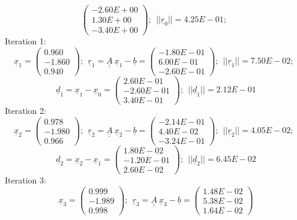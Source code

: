 \documentclass{report}[10pts]
\begin{document}
\begin{small}
\[\begin{pmatrix}
   -2.60E+00 \\ 1.30E+00 \\ -3.40E+00
   \end{pmatrix}
;~~
||
\underline{r}_{0}
||=
4.25E-01
;~~
\]
Iteration 1:
\[
\underline{x}_{1}=
   \begin{pmatrix}
   0.960 \\ -1.860 \\ 0.940
   \end{pmatrix}
;~~
\underline{r}_{1}=
\underline{\underline{A}}~\underline{x}_{1}-
\underline{b}=
   \begin{pmatrix}
   -1.80E-01 \\ 6.00E-01 \\ -2.60E-01
   \end{pmatrix}
;~~
||
\underline{r}_{1}
||=
7.50E-02
;~~
\]
\[
\underline{d}_{1}=
\underline{x}_{1}-
\underline{x}_{0}=
   \begin{pmatrix}
   2.60E-01 \\ -2.60E-01 \\ 3.40E-01
   \end{pmatrix}
;~~
||
\underline{d}_{1}
||=
2.12E-01
\]
Iteration 2:
\[
\underline{x}_{2}=
   \begin{pmatrix}
   0.978 \\ -1.980 \\ 0.966
   \end{pmatrix}
;~~
\underline{r}_{2}=
\underline{\underline{A}}~\underline{x}_{2}-
\underline{b}=
   \begin{pmatrix}
   -2.14E-01 \\ 4.40E-02 \\ -3.24E-01
   \end{pmatrix}
;~~
||
\underline{r}_{2}
||=
4.05E-02
;~~
\]
\[
\underline{d}_{2}=
\underline{x}_{2}-
\underline{x}_{1}=
   \begin{pmatrix}
   1.80E-02 \\ -1.20E-01 \\ 2.60E-02
   \end{pmatrix}
;~~
||
\underline{d}_{2}
||=
6.45E-02
\]
Iteration 3:
\[
\underline{x}_{3}=
   \begin{pmatrix}
   0.999 \\ -1.989 \\ 0.998
   \end{pmatrix}
;~~
\underline{r}_{3}=
\underline{\underline{A}}~\underline{x}_{3}-
\underline{b}=
   \begin{pmatrix}
   1.48E-02 \\ 5.38E-02 \\ 1.64E-02

\end{pmatrix}\]
\end{small}
\end{document}
